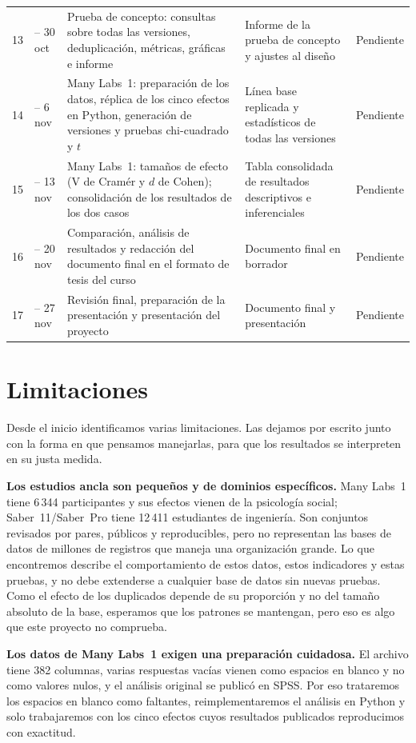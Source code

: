 \documentclass[11pt,openany,oneside,letterpaper]{book}
\begin{document}
{\begin{longtable}{c >{\raggedright\arraybackslash}p{1.8cm} >{\raggedright\arraybackslash}p{4.6cm} >{\raggedright\arraybackslash}p{4.3cm} >{\raggedright\arraybackslash}p{1.5cm}}
13 & 26 -- 30 oct & Prueba de concepto: consultas sobre todas las versiones, deduplicación, métricas, gráficas e informe & Informe de la prueba de concepto y ajustes al diseño & Pendiente \\
14 & 3 -- 6 nov & Many Labs~1: preparación de los datos, réplica de los cinco efectos en Python, generación de versiones y pruebas chi-cuadrado y $t$ & Línea base replicada y estadísticos de todas las versiones & Pendiente \\
15 & 9 -- 13 nov & Many Labs~1: tamaños de efecto (V de Cramér y $d$ de Cohen); consolidación de los resultados de los dos casos & Tabla consolidada de resultados descriptivos e inferenciales & Pendiente \\
16 & 17 -- 20 nov & Comparación, análisis de resultados y redacción del documento final en el formato de tesis del curso & Documento final en borrador & Pendiente \\
17 & 23 -- 27 nov & Revisión final, preparación de la presentación y presentación del proyecto & Documento final y presentación & Pendiente \\
\end{longtable}
}
\chapter{Limitaciones}

Desde el inicio identificamos varias limitaciones. Las dejamos por escrito junto con la forma en que pensamos manejarlas, para que los resultados se interpreten en su justa medida.

\textbf{Los estudios ancla son pequeños y de dominios específicos.} Many Labs~1 tiene 6\,344 participantes y sus efectos vienen de la psicología social; Saber~11/Saber~Pro tiene 12\,411 estudiantes de ingeniería. Son conjuntos revisados por pares, públicos y reproducibles, pero no representan las bases de datos de millones de registros que maneja una organización grande. Lo que encontremos describe el comportamiento de estos datos, estos indicadores y estas pruebas, y no debe extenderse a cualquier base de datos sin nuevas pruebas. Como el efecto de los duplicados depende de su proporción y no del tamaño absoluto de la base, esperamos que los patrones se mantengan, pero eso es algo que este proyecto no comprueba.

\textbf{Los datos de Many Labs~1 exigen una preparación cuidadosa.} El archivo tiene 382 columnas, varias respuestas vacías vienen como espacios en blanco y no como valores nulos, y el análisis original se publicó en SPSS. Por eso trataremos los espacios en blanco como faltantes, reimplementaremos el análisis en Python y solo trabajaremos con los cinco efectos cuyos resultados publicados reproducimos con exactitud.
\end{document}
